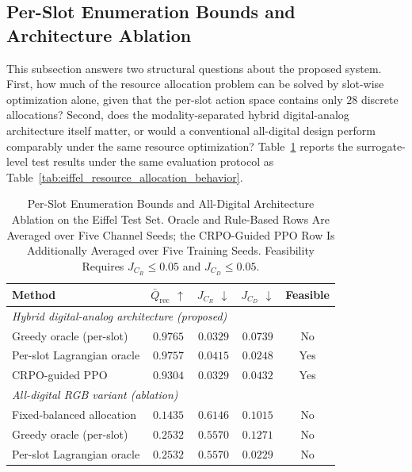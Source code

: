 \documentclass[journal]{IEEEtran}
\begin{document}
\subsection{Per-Slot Enumeration Bounds and Architecture Ablation}
\label{sec:oracle_ablation}

This subsection answers two structural questions about the proposed system. First, how much of the resource allocation problem can be solved by slot-wise optimization alone, given that the per-slot action space contains only $28$ discrete allocations? Second, does the modality-separated hybrid digital-analog architecture itself matter, or would a conventional all-digital design perform comparably under the same resource optimization? Table~\ref{tab:oracle_ablation} reports the surrogate-level test results under the same evaluation protocol as Table~\ref{tab:eiffel_resource_allocation_behavior}.

\begin{table}[t]
\centering
\caption{Per-Slot Enumeration Bounds and All-Digital Architecture Ablation on the Eiffel Test Set. Oracle and Rule-Based Rows Are Averaged over Five Channel Seeds; the CRPO-Guided PPO Row Is Additionally Averaged over Five Training Seeds. Feasibility Requires $J_{C_R}\le0.05$ and $J_{C_D}\le0.05$.}
\label{tab:oracle_ablation}
\footnotesize
\setlength{\tabcolsep}{4pt}
\renewcommand{\arraystretch}{1.08}
\begin{tabular}{l c c c c}
\hline
Method & $\bar{Q}_{\mathrm{rec}}$ $\uparrow$ & $J_{C_R}$ $\downarrow$ & $J_{C_D}$ $\downarrow$ & Feasible \\
\hline
\multicolumn{5}{l}{\textit{Hybrid digital-analog architecture (proposed)}} \\
Greedy oracle (per-slot) & $0.9765$ & $0.0329$ & $0.0739$ & No \\
Per-slot Lagrangian oracle & $0.9757$ & $0.0415$ & $0.0248$ & Yes \\
CRPO-guided PPO & $0.9304$ & $0.0329$ & $0.0432$ & Yes \\
\hline
\multicolumn{5}{l}{\textit{All-digital RGB variant (ablation)}} \\
Fixed-balanced allocation & $0.1435$ & $0.6146$ & $0.1015$ & No \\
Greedy oracle (per-slot) & $0.2532$ & $0.5570$ & $0.1271$ & No \\
Per-slot Lagrangian oracle & $0.2532$ & $0.5570$ & $0.0229$ & No \\
\hline
\end{tabular}
\end{table}
\end{document}
